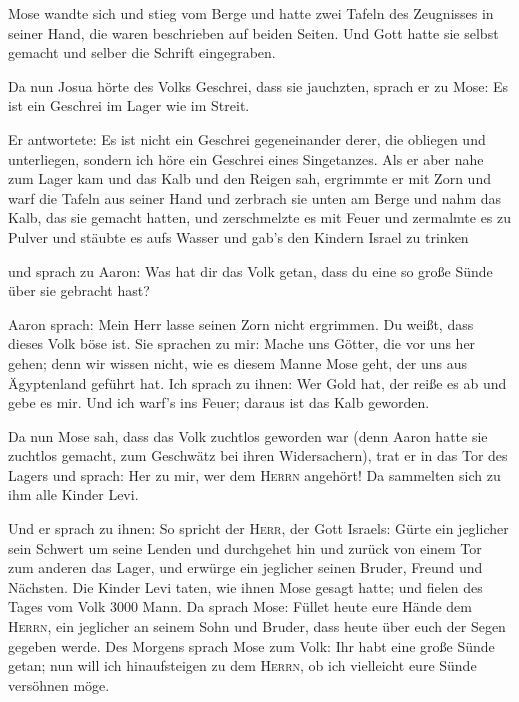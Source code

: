  Mose wandte sich und stieg vom Berge und hatte zwei
Tafeln des Zeugnisses in seiner Hand, die waren beschrieben auf beiden
Seiten.  Und Gott hatte sie selbst gemacht und selber die
Schrift eingegraben.

 Da nun Josua hörte des Volks Geschrei, dass sie
jauchzten, sprach er zu Mose: Es ist ein Geschrei im Lager wie im
Streit.

 Er antwortete: Es ist nicht ein Geschrei gegeneinander
derer, die obliegen und unterliegen, sondern ich höre ein Geschrei eines
Singetanzes.  Als er aber nahe zum Lager kam und das Kalb
und den Reigen sah, ergrimmte er mit Zorn und warf die Tafeln aus seiner
Hand und zerbrach sie unten am Berge  und nahm das Kalb,
das sie gemacht hatten, und zerschmelzte es mit Feuer und zermalmte es
zu Pulver und stäubte es aufs Wasser und gab's den Kindern Israel zu
trinken

 und sprach zu Aaron: Was hat dir das Volk getan, dass du
eine so große Sünde über sie gebracht hast?

 Aaron sprach: Mein Herr lasse seinen Zorn nicht
ergrimmen. Du weißt, dass dieses Volk böse ist.  Sie
sprachen zu mir: Mache uns Götter, die vor uns her gehen; denn wir
wissen nicht, wie es diesem Manne Mose geht, der uns aus Ägyptenland
geführt hat.  Ich sprach zu ihnen: Wer Gold hat, der
reiße es ab und gebe es mir. Und ich warf's ins Feuer; daraus ist das
Kalb geworden.

 Da nun Mose sah, dass das Volk zuchtlos geworden war
(denn Aaron hatte sie zuchtlos gemacht, zum Geschwätz bei ihren
Widersachern),  trat er in das Tor des Lagers und sprach:
Her zu mir, wer dem \textsc{Herrn} angehört! Da sammelten sich zu ihm
alle Kinder Levi.

 Und er sprach zu ihnen: So spricht der \textsc{Herr},
der Gott Israels: Gürte ein jeglicher sein Schwert um seine Lenden und
durchgehet hin und zurück von einem Tor zum anderen das Lager, und
erwürge ein jeglicher seinen Bruder, Freund und Nächsten.
 Die Kinder Levi taten, wie ihnen Mose gesagt hatte; und
fielen des Tages vom Volk 3000 Mann.  Da sprach Mose:
Füllet heute eure Hände dem \textsc{Herrn}, ein jeglicher an seinem Sohn
und Bruder, dass heute über euch der Segen gegeben werde.
 Des Morgens sprach Mose zum Volk: Ihr habt eine große
Sünde getan; nun will ich hinaufsteigen zu dem \textsc{Herrn}, ob ich
vielleicht eure Sünde versöhnen möge.

